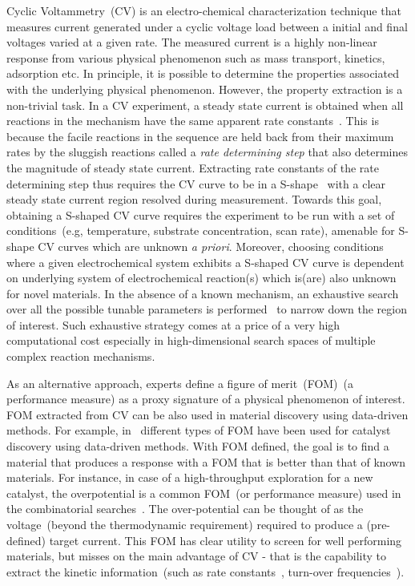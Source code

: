 Cyclic Voltammetry~(CV) is an electro-chemical characterization technique that measures current generated under a cyclic voltage load between a initial and final voltages varied at a given rate.
The measured current is a highly non-linear response from various physical phenomenon such as mass transport, kinetics, adsorption etc. 
In principle, it is possible to determine the properties associated with the underlying physical phenomenon. 
However, the property extraction is a non-trivial task. 
In a CV experiment, a steady state current is obtained when all reactions in the mechanism have the same apparent rate constants~\cite{BardFaulkner}. 
This is because the facile reactions in the sequence are held back from their maximum rates by the sluggish reactions called a \textit{rate determining step} that also determines the magnitude of steady state current.   
Extracting rate constants of the rate determining step thus requires the CV curve to be in a S-shape~\cite{costentin2015cyclic, rountree2014evaluation} with a clear steady state current region resolved during measurement. 
Towards this goal, obtaining a S-shaped CV curve requires the experiment to be run with a set of conditions~(e.g, temperature, substrate concentration, scan rate), amenable for S-shape CV curves which are unknown \textit{a priori}.
Moreover, choosing conditions where a given electrochemical system exhibits a S-shaped CV curve is dependent on underlying system of electrochemical reaction(s) which is(are) also unknown for novel materials. 
In the absence of a known mechanism, an exhaustive search over all the possible tunable parameters is performed~\cite{martin2016qualitative} to narrow down the region of interest. 
Such exhaustive strategy comes at a price of a very high computational cost especially in high-dimensional search spaces of multiple complex reaction mechanisms.

As an alternative approach, experts define a figure of merit~(FOM)~\cite{rountree2014evaluation}(a performance measure) as a proxy signature of a physical phenomenon of interest. 
FOM extracted from CV can be also used in material discovery using data-driven methods. 
For example, in~\cite{stein2019functional,li2019application,haber2014high,suram2015generating} different types of FOM have been used for catalyst discovery using data-driven methods.
With FOM defined, the goal is to find a material that produces a response with a FOM that is better than that of known materials.
For instance, in case of a high-throughput exploration for a new catalyst, the overpotential is a common FOM~\cite{norskov2004origin}(or performance measure) used in the combinatorial searches~\cite{suram2015generating}. 
The over-potential can be thought of as the voltage~(beyond the thermodynamic requirement) required to produce a (pre-defined) target current.
This FOM has clear utility to screen for well performing materials, but misses on the main advantage of CV - that is the capability to extract the kinetic information~(such as rate constants~\cite{FOWA}, turn-over frequencies~\cite{TOF,FOWA2}).

